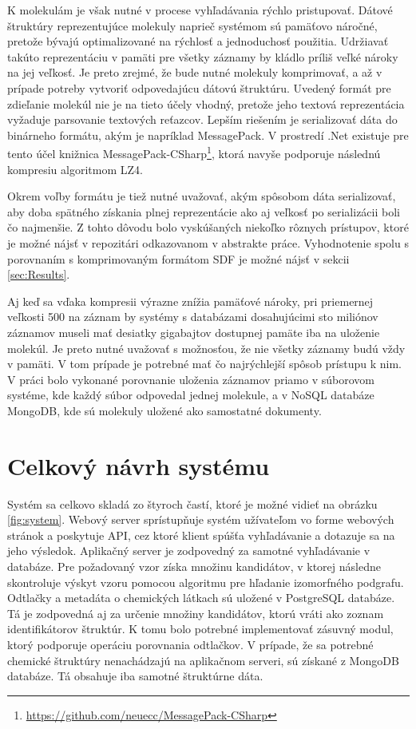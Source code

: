 \documentclass[slovak]{ExcelAtFIT} %
\begin{document}
K molekulám je však nutné v procese vyhľadávania rýchlo pristupovať. Dátové štruktúry reprezentujúce molekuly naprieč systémom sú pamäťovo náročné, pretože bývajú optimalizované na rýchlosť a jednoduchosť použitia. Udržiavať takúto reprezentáciu v pamäti pre všetky záznamy by kládlo príliš veľké nároky na jej veľkosť. Je preto zrejmé, že bude nutné molekuly komprimovať, a až v prípade potreby vytvoriť odpovedajúcu dátovú štruktúru. Uvedený formát pre zdieľanie molekúl nie je na tieto účely vhodný, pretože jeho textová reprezentácia vyžaduje parsovanie textových reťazcov. Lepším riešením je serializovať dáta do binárneho formátu, akým je napríklad MessagePack. V prostredí .Net existuje pre tento účel knižnica MessagePack-CSharp\footnote{\url{https://github.com/neuecc/MessagePack-CSharp}}, ktorá navyše podporuje následnú kompresiu algoritmom LZ4. 

Okrem voľby formátu je tiež nutné uvažovať, akým spôsobom dáta serializovať, aby doba spätného zí\-ska\-nia plnej reprezentácie ako aj veľkosť po serializácii boli čo najmenšie. Z tohto dôvodu bolo vyskúšaných niekoľko rôznych prístupov, ktoré je možné nájsť v repozitári odkazovanom v abstrakte práce. Vyhodnotenie spolu s porovnaním s komprimovaným formátom SDF je možné nájsť v sekcii \ref{sec:Results}.

Aj keď sa vďaka kompresii výrazne znížia pamä\-ťové nároky, pri priemernej veľkosti \SI{500}{\byte} na záznam by systémy s databázami dosahujúcimi sto miliónov zá\-zna\-mov museli mať desiatky gigabajtov dostupnej pamäte iba na uloženie molekúl. Je preto nutné u\-va\-žo\-vať s možnosťou, že nie všetky záznamy budú vždy v pamäti. V tom prípade je potrebné mať čo najrýchlejší spôsob prístupu k nim. V práci bolo vykonané porovnanie uloženia záznamov priamo v súborovom systéme, kde každý súbor odpovedal jednej molekule, a v NoSQL databáze MongoDB, kde sú molekuly uložené ako samostatné dokumenty.

\section{Celkový návrh systému}
Systém sa celkovo skladá zo štyroch častí, ktoré je možné vidieť na obrázku \ref{fig:system}. Webový server sprístupňuje systém užívateľom vo forme webových stránok a poskytuje API, cez ktoré klient spúšťa vyhľadávanie a dotazuje sa na jeho výsledok. Aplikačný server je zodpovedný za samotné vyhľadávanie v databáze. Pre požadovaný vzor získa množinu kandidátov, v ktorej následne skontroluje výskyt vzoru pomocou algoritmu pre hľadanie izomorfného podgrafu. Odtlačky a metadáta o chemických látkach sú uložené v PostgreSQL databáze. Tá je zodpovedná aj za určenie množiny kandidátov, ktorú vráti ako zoznam identifikátorov štruktúr. K tomu bolo potrebné implementovať zásuvný modul, ktorý podporuje operáciu porovnania odtlačkov. V prípade, že sa potrebné chemické štruktúry nenachádzajú na aplikačnom serveri, sú získané z MongoDB databáze. Tá obsahuje iba samotné štruktúrne dáta.
\end{document}
